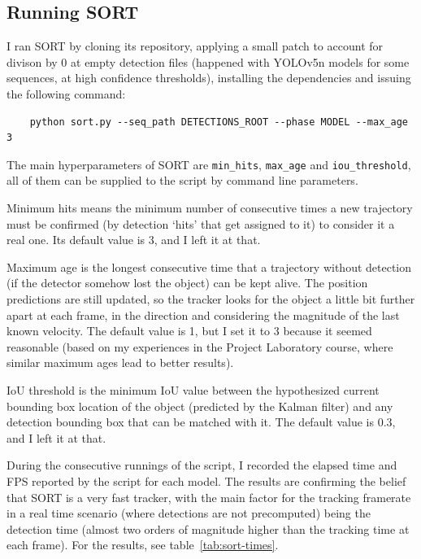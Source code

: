 \subsection{Running SORT}

I ran SORT by cloning its repository, applying a small patch to account for divison by 0 at empty detection files (happened with YOLOv5n models for some sequences, at high confidence thresholds), installing the dependencies and issuing the following command:
\begin{verbatim}
    python sort.py --seq_path DETECTIONS_ROOT --phase MODEL --max_age 3
\end{verbatim}

The main hyperparameters of SORT are \verb|min_hits|, \verb|max_age| and \verb|iou_threshold|, all of them can be supplied to the script by command line parameters.

Minimum hits means the minimum number of consecutive times a new trajectory must be confirmed (by detection `hits' that get assigned to it) to consider it a real one. Its default value is 3, and I left it at that.

Maximum age is the longest consecutive time that a trajectory without detection (if the detector somehow lost the object) can be kept alive. The position predictions are still updated, so the tracker looks for the object a little bit further apart at each frame, in the direction and considering the magnitude of the last known velocity. The default value is 1, but I set it to 3 because it seemed reasonable (based on my experiences in the Project Laboratory course, where similar maximum ages lead to better results).

IoU threshold is the minimum IoU value between the hypothesized current bounding box location of the object (predicted by the Kalman filter) and any detection bounding box that can be matched with it. The default value is 0.3, and I left it at that.

During the consecutive runnings of the script, I recorded the elapsed time and FPS reported by the script for each model. The results are confirming the belief that SORT is a very fast tracker, with the main factor for the tracking framerate in a real time scenario (where detections are not precomputed) being the detection time (almost two orders of magnitude higher than the tracking time at each frame). For the results, see table~\ref{tab:sort-times}.

